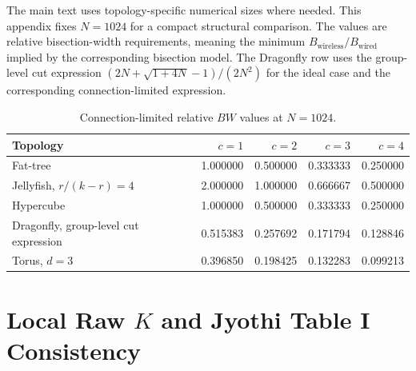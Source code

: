 \documentclass[conference]{IEEEtran}
\begin{document}
The main text uses topology-specific numerical sizes where needed. This appendix fixes \(N=1024\) for a compact structural comparison. The values are relative bisection-width requirements, meaning the minimum \(B_{\mathrm{wireless}}/B_{\mathrm{wired}}\) implied by the corresponding bisection model. The Dragonfly row uses the group-level cut expression
\(\left(2N+\sqrt{1+4N}-1\right)/(2N^2)\) for the ideal case and the corresponding connection-limited expression.

\begin{table}[!t]
\centering
\caption{Ideal full-mesh relative \(BW\) values at \(N=1024\).}
\scriptsize
{}
\end{table}

\begin{table}[!t]
\centering
\caption{Connection-limited relative \(BW\) values at \(N=1024\).}
\small
\begin{tabular}{lrrrr}
\toprule
Topology & \(c=1\) & \(c=2\) & \(c=3\) & \(c=4\) \\
\midrule
Fat-tree & 1.000000 & 0.500000 & 0.333333 & 0.250000 \\
Jellyfish, \(r/(k-r)=4\) & 2.000000 & 1.000000 & 0.666667 & 0.500000 \\
Hypercube & 1.000000 & 0.500000 & 0.333333 & 0.250000 \\
Dragonfly, group-level cut expression & 0.515383 & 0.257692 & 0.171794 & 0.128846 \\
Torus, \(d=3\) & 0.396850 & 0.198425 & 0.132283 & 0.099213 \\
\bottomrule
\end{tabular}
\end{table}

\section{Local Raw \(K\) and Jyothi Table I Consistency}
\end{document}
